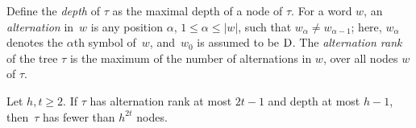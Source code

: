 Define the
\emph{depth} of $\tau$ as 
the maximal depth of a node of $\tau$.
For a word $w$, an \emph{alternation} in~$w$ is any 
position $\alpha$, $1\leq \alpha\leq |w|$, such that $w_\alpha\neq w_{\alpha-1}$; here, $w_\alpha$ denotes the $\alpha$th symbol of~$w$, and~$w_0$ is assumed to be $\mathrm{D}$.
The \emph{alternation rank} of the tree $\tau$ is the maximum of the number of alternations in $w$, over all nodes $w$ of $\tau$.


\begin{lemma}[$\star$]\label{lem:number-of-nodes}
Let $h,t\ge 2$.	If $\tau$ has alternation rank at most $2t-1$ and depth at most $h-1$, then~$\tau$ has fewer than $h^{2t}$ nodes.
\end{lemma}

